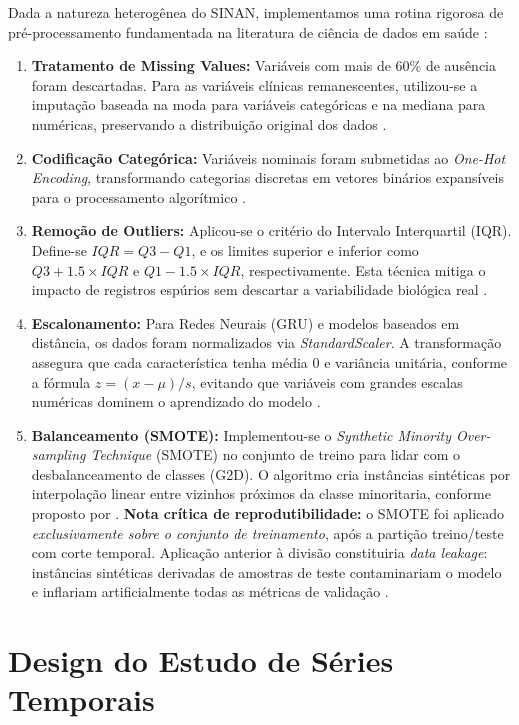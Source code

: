 Dada a natureza heterogênea do SINAN, implementamos uma rotina rigorosa de pré-processamento fundamentada na literatura de ciência de dados em saúde \cite{scikit_learn}:
\begin{enumerate}
    \item \textbf{Tratamento de Missing Values:} Variáveis com mais de 60\% de ausência foram descartadas. Para as variáveis clínicas remanescentes, utilizou-se a imputação baseada na moda para variáveis categóricas e na mediana para numéricas, preservando a distribuição original dos dados \cite{little2019missing}.
    \item \textbf{Codificação Categórica:} Variáveis nominais foram submetidas ao \textit{One-Hot Encoding}, transformando categorias discretas em vetores binários expansíveis para o processamento algorítmico \cite{potdar2017categorical}.
    \item \textbf{Remoção de Outliers:} Aplicou-se o critério do Intervalo Interquartil (IQR). Define-se $IQR = Q3 - Q1$, e os limites superior e inferior como $Q3 + 1.5 \times IQR$ e $Q1 - 1.5 \times IQR$, respectivamente. Esta técnica mitiga o impacto de registros espúrios sem descartar a variabilidade biológica real \cite{rousseeuw2011outliers}.
    \item \textbf{Escalonamento:} Para Redes Neurais (GRU) e modelos baseados em distância, os dados foram normalizados via \textit{StandardScaler}. A transformação assegura que cada característica tenha média 0 e variância unitária, conforme a fórmula $z = (x - \mu) / s$, evitando que variáveis com grandes escalas numéricas dominem o aprendizado do modelo \cite{scikit_learn}.
    \item \textbf{Balanceamento (SMOTE):} Implementou-se o \textit{Synthetic Minority Over-sampling Technique} (SMOTE) no conjunto de treino para lidar com o desbalanceamento de classes (G2D). O algoritmo cria instâncias sintéticas por interpolação linear entre vizinhos próximos da classe minoritaria, conforme proposto por \cite{smote_chawla}. \textbf{Nota crítica de reprodutibilidade:} o SMOTE foi aplicado \textit{exclusivamente sobre o conjunto de treinamento}, após a partição treino/teste com corte temporal. Aplicação anterior à divisão constituiria \textit{data leakage}: instâncias sintéticas derivadas de amostras de teste contaminariam o modelo e inflariam artificialmente todas as métricas de validação \cite{little2019missing}.
\end{enumerate}

\section{Design do Estudo de Séries Temporais}

